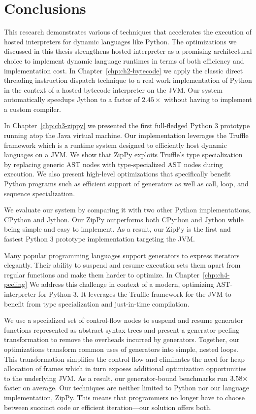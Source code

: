 \chapter{Conclusions}
\label{chp:ch7-conclusions}

This research demonstrates various of techniques that accelerates the execution of hosted interpreters for dynamic languages like Python.
The optimizations we discussed in this thesis strengthens hosted interpreter as a promising architectural choice to implement dynamic language runtimes in terms of both efficiency and implementation cost.
In Chapter~\ref{chp:ch2-bytecode} we apply the classic direct threading instruction dispatch technique to a real work implementation of Python in the context of a hosted bytecode interpreter on the JVM.
Our system automatically speedups Jython to a factor of $2.45\times$ without having to implement a custom compiler.

In Chapter~\ref{chp:ch3-zippy} we presented the first full-fledged Python 3 prototype running atop the Java virtual machine.
Our implementation leverages the Truffle framework which is a runtime system designed to efficiently host dynamic languages on a JVM.
We show that ZipPy exploits Truffle's type specialization by replacing generic AST nodes with type-specialized AST nodes during execution.
We also present high-level optimizations that specifically benefit Python programs such as efficient support of generators as well as call, loop, and sequence specialization.

We evaluate our system by comparing it with two other Python implementations, CPython and Jython.
Our ZipPy outperforms both CPython and Jython while being simple and easy to implement.
As a result, our ZipPy is the first and fastest Python 3 prototype implementation targeting the JVM.

Many popular programming languages support generators to express iterators elegantly.
Their ability to suspend and resume execution sets them apart from regular functions and make them harder to optimize. 
In Chapter~\ref{chp:ch4-peeling} We address this challenge in context of a modern, optimizing AST-interpreter for Python 3. 
It leverages the Truffle framework for the JVM to benefit from type specialization and just-in-time compilation.

We use a specialized set of control-flow nodes to suspend and resume generator functions represented as abstract syntax trees and present a generator peeling transformation to remove the overheads incurred by generators.
Together, our optimizations transform common uses of generators into simple, nested loops. 
This transformation simplifies the control flow and eliminates the need for heap allocation of frames which in turn exposes additional optimization opportunities to the underlying JVM.
As a result, our generator-bound benchmarks run $3.58{}\times$ faster on average.
Our techniques are neither limited to Python nor our language implementation, ZipPy.
This means that programmers no longer have to choose between succinct code or efficient iteration---our solution offers both.

